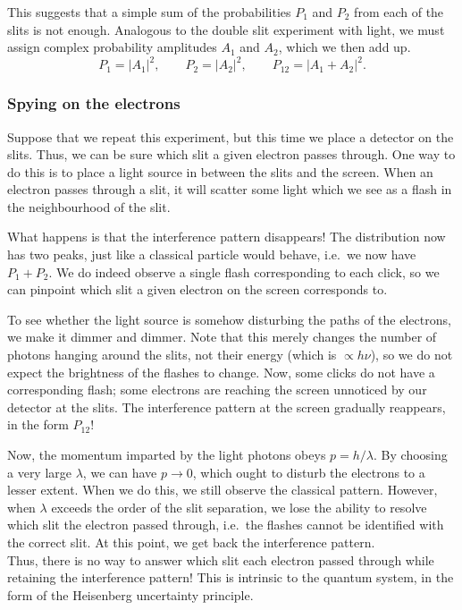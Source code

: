 \documentclass[11pt]{article}
\theoremstyle{definition}
\theoremstyle{remark}
\numberwithin{equation}{section}
\begin{document}
    This suggests that a simple sum of the probabilities $P_1$ and $P_2$ from each
    of the slits is not enough. Analogous to the double slit experiment with light,
    we must assign complex probability amplitudes $A_1$ and $A_2$, which we then add
    up. \[
        P_1 = |A_1|^2, \qquad P_2 = |A_2|^2, \qquad P_{12} = |A_1 + A_2|^2.
    \] 
    
    \subsubsection{Spying on the electrons}
    Suppose that we repeat this experiment, but this time we place a detector on the
    slits. Thus, we can be sure which slit a given electron passes through.
    One way to do this is to place a light source in between the slits and the
    screen. When an electron passes through a slit, it will scatter some light which
    we see as a flash in the neighbourhood of the slit.

    What happens is that the interference pattern disappears! The distribution now
    has two peaks, just like a classical particle would behave, i.e.\ we now have
    $P_1 + P_2$.  We do indeed observe a single flash corresponding to each click,
    so we can pinpoint which slit a given electron on the screen corresponds to.

    To see whether the light source is somehow disturbing the paths of the
    electrons, we make it dimmer and dimmer.  Note that this merely changes the
    number of photons hanging around the slits, not their energy (which is $\propto
    h\nu$), so we do not expect the brightness of the flashes to change.  Now, some
    clicks do not have a corresponding flash; some electrons are reaching the screen
    unnoticed by our detector at the slits. The interference pattern at the screen
    gradually reappears, in the form $P_{12}$!

    Now, the momentum imparted by the light photons obeys $p = h / \lambda$. By
    choosing a very large $\lambda$, we can have $p \to 0$, which ought to disturb
    the electrons to a lesser extent. When we do this, we still observe the
    classical pattern. However, when $\lambda$ exceeds the order of the slit
    separation, we lose the ability to resolve which slit the electron passed
    through, i.e.\ the flashes cannot be identified with the correct slit. At this
    point, we get back the interference pattern. \\

    Thus, there is no way to answer which slit each electron passed through while
    retaining the interference pattern!
    This is intrinsic to the quantum system, in the form of the Heisenberg
    uncertainty principle.
\end{document}
